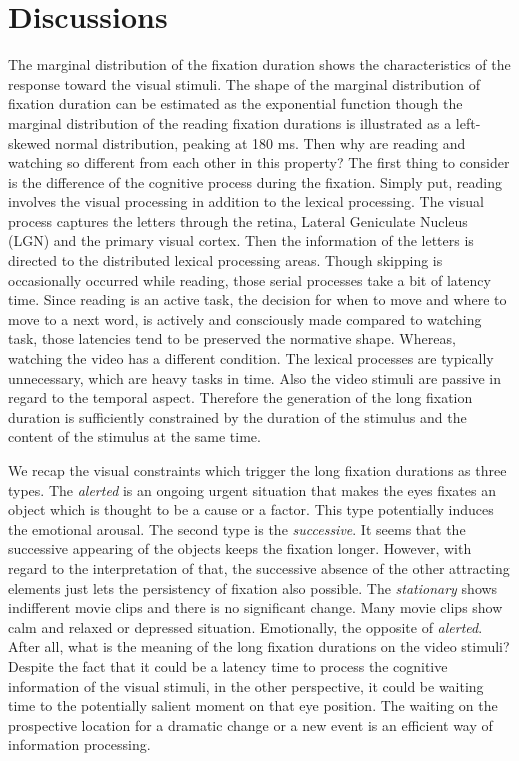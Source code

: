 \documentclass[10pt,letterpaper]{article}
\begin{document}
\section{Discussions}

The marginal distribution of the fixation duration shows the characteristics of the response toward the visual stimuli. The shape of the marginal distribution of fixation duration can be estimated as the exponential function though the marginal distribution of the reading fixation durations is illustrated as a left-skewed normal distribution, peaking at 180 ms. Then why are reading and watching so different from each other in this property? The first thing to consider is the difference of the cognitive process during the fixation. Simply put, reading involves the visual processing in addition to the lexical processing. The visual process captures the letters through the retina, Lateral Geniculate Nucleus (LGN) and the primary visual cortex. Then the information of the letters is directed to the distributed lexical processing areas. Though skipping is occasionally occurred while reading, those serial processes take a bit of latency time. Since reading is an active task, the decision for when to move and where to move to a next word, is actively and consciously made compared to watching task, those latencies tend to be preserved the normative shape. Whereas, watching the video has a different condition. The lexical processes are typically unnecessary, which are heavy tasks in time. Also the video stimuli are passive in regard to the temporal aspect. Therefore the generation of the long fixation duration is sufficiently constrained by the duration of the stimulus and the content of the stimulus at the same time. 

We recap the visual constraints which trigger the long fixation durations as three types. The \textit{alerted} is an ongoing urgent situation that makes the eyes fixates an object which is thought to be a cause or a factor. This type potentially induces the emotional arousal. The second type is the \textit{successive}. It seems that the successive appearing of the objects keeps the fixation longer. However, with regard to the interpretation of that, the successive absence of the other attracting elements just lets the persistency of fixation also possible. The \textit{stationary} shows indifferent movie clips and there is no significant change. Many movie clips show calm and relaxed or depressed situation. Emotionally, the opposite of \textit{alerted}. After all, what is the meaning of the long fixation durations on the video stimuli? Despite the fact that it could be a latency time to process the cognitive information of the visual stimuli, in the other perspective, it could be waiting time to the potentially salient moment on that eye position. The waiting on the prospective location for a dramatic change or a new event is an efficient way of information processing.
\end{document}

